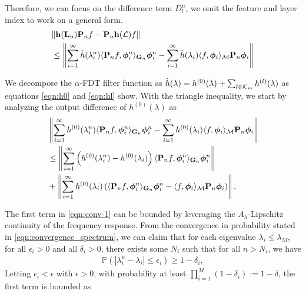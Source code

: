  Therefore, we can focus on the difference term $D_l^n$, we omit the feature and layer index to work on a general form.
  \begin{align}
    &\nonumber \|{\mathbf h}({\mathbf L}_n){\mathbf P}_n f - {\mathbf P}_n{\mathbf h}({\mathcal L}) f\|\\
    &\leq \left\| \sum_{i=1}^\infty \hat{h}(\lambda_i^n) \langle {\ensuremath{\mathbf P}}_nf,\bm\phi_i^n \rangle_{{\mathbf G}_n}\bm\phi_i^n - \sum_{i=1}^\infty \hat{h}(\lambda_i)\langle f,\bm\phi_i\rangle_{{\mathcal M}} {\mathbf P}_n \bm\phi_i  \right\|
 \end{align}
 
 We decompose the $\alpha$-FDT filter function as $\hat{h}(\lambda)=h^{(0)}(\lambda)+\sum_{l\in{\ensuremath{\mathcal K}}_m}h^{(l)}(\lambda)$ as equations \eqref{eqn:h0} and \eqref{eqn:hl} show. With the triangle inequality, we start by analyzing the output difference of $h^{(0)}(\lambda)$ as
 \begin{align}
    & \nonumber \left\| \sum_{i=1}^\infty {h}^{(0)}(\lambda_i^n) \langle {\ensuremath{\mathbf P}}_nf,\bm\phi_i^n \rangle_{{\mathbf G}_n}\bm\phi_i^n - \sum_{i=1}^\infty {h}^{(0)}(\lambda_i)\langle f,\bm\phi_i\rangle_{{\mathcal M}} {\mathbf P}_n \bm\phi_i  \right\|
     \\ 
     &\nonumber \leq  \left\| \sum_{i=1}^\infty \left({h}^{(0)}(\lambda_i^n)- {h}^{(0)}(\lambda_i) \right) \langle {\ensuremath{\mathbf P}}_nf,\bm\phi_i^n \rangle_{{\mathbf G}_n}\bm\phi_i^n \right\| \\
     &  +\left\| \sum_{i=1}^\infty {h}^{(0)}(\lambda_i)\left( \langle {\ensuremath{\mathbf P}}_n f,\bm\phi_i^n \rangle_{{\mathbf G}_n} \bm\phi_i^n - \langle f,\bm\phi_i \rangle_{{\mathcal M}} {\mathbf P}_n \bm\phi_i \right)  \right\|.\label{eqn:conv-1}
 \end{align}
 
 The first term in \eqref{eqn:conv-1} can be bounded by leveraging the $A_h$-Lipschitz continuity of the frequency response. From the convergence in probability stated in \eqref{eqn:convergence_spectrum}, we can claim that for each eigenvalue $\lambda_i \leq \lambda_M$, for all $\epsilon_i>0$ and all $\delta_i>0$, there exists some $N_i$ such that for all $n>N_i$, we have
\begin{gather}
 \label{eqn:eigenvalue}   \mathbb{P}(|\lambda_i^n-\lambda_i|\leq \epsilon_i)\geq 1-\delta_i,
 \end{gather}
Letting $\epsilon_i < \epsilon$ with $\epsilon > 0$, with probability at least $\prod_{i=1}^M(1-\delta_i) := 1-\delta$, the first term is bounded as 
 
